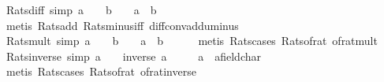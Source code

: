 \begin{isabellebody}
%
\isadelimproof
\isanewline
%
\endisadelimproof
\isanewline
{}\isamarkupfalse%
\ Rats{\isacharunderscore}{\kern0pt}diff\ {\isacharbrackleft}{\kern0pt}simp{\isacharbrackright}{\kern0pt}{\isacharcolon}{\kern0pt}\ {\isachardoublequoteopen}a\ {\isasymin}\ {\isasymrat}\ {\isasymLongrightarrow}\ b\ {\isasymin}\ {\isasymrat}\ {\isasymLongrightarrow}\ a\ {\isacharminus}{\kern0pt}\ b\ {\isasymin}\ {\isasymrat}{\isachardoublequoteclose}\isanewline
%
\isadelimproof
\ \ %
\endisadelimproof
%
\isatagproof
{}\isamarkupfalse%
\ {\isacharparenleft}{\kern0pt}metis\ Rats{\isacharunderscore}{\kern0pt}add\ Rats{\isacharunderscore}{\kern0pt}minus{\isacharunderscore}{\kern0pt}iff\ diff{\isacharunderscore}{\kern0pt}conv{\isacharunderscore}{\kern0pt}add{\isacharunderscore}{\kern0pt}uminus{\isacharparenright}{\kern0pt}%
\endisatagproof
{\isafoldproof}%
%
\isadelimproof
\isanewline
%
\endisadelimproof
\isanewline
{}\isamarkupfalse%
\ Rats{\isacharunderscore}{\kern0pt}mult\ {\isacharbrackleft}{\kern0pt}simp{\isacharbrackright}{\kern0pt}{\isacharcolon}{\kern0pt}\ {\isachardoublequoteopen}a\ {\isasymin}\ {\isasymrat}\ {\isasymLongrightarrow}\ b\ {\isasymin}\ {\isasymrat}\ {\isasymLongrightarrow}\ a\ {\isacharasterisk}{\kern0pt}\ b\ {\isasymin}\ {\isasymrat}{\isachardoublequoteclose}\isanewline
%
\isadelimproof
\ \ %
\endisadelimproof
%
\isatagproof
{}\isamarkupfalse%
\ {\isacharparenleft}{\kern0pt}metis\ Rats{\isacharunderscore}{\kern0pt}cases\ Rats{\isacharunderscore}{\kern0pt}of{\isacharunderscore}{\kern0pt}rat\ of{\isacharunderscore}{\kern0pt}rat{\isacharunderscore}{\kern0pt}mult{\isacharparenright}{\kern0pt}%
\endisatagproof
{\isafoldproof}%
%
\isadelimproof
\isanewline
%
\endisadelimproof
\isanewline
{}\isamarkupfalse%
\ Rats{\isacharunderscore}{\kern0pt}inverse\ {\isacharbrackleft}{\kern0pt}simp{\isacharbrackright}{\kern0pt}{\isacharcolon}{\kern0pt}\ {\isachardoublequoteopen}a\ {\isasymin}\ {\isasymrat}\ {\isasymLongrightarrow}\ inverse\ a\ {\isasymin}\ {\isasymrat}{\isachardoublequoteclose}\isanewline
\ \ \ a\ {\isacharcolon}{\kern0pt}{\isacharcolon}{\kern0pt}\ {\isachardoublequoteopen}{\isacharprime}{\kern0pt}a{\isacharcolon}{\kern0pt}{\isacharcolon}{\kern0pt}field{\isacharunderscore}{\kern0pt}char{\isacharunderscore}{\kern0pt}{}{\isachardoublequoteclose}\isanewline
%
\isadelimproof
\ \ %
\endisadelimproof
%
\isatagproof
{}\isamarkupfalse%
\ {\isacharparenleft}{\kern0pt}metis\ Rats{\isacharunderscore}{\kern0pt}cases\ Rats{\isacharunderscore}{\kern0pt}of{\isacharunderscore}{\kern0pt}rat\ of{\isacharunderscore}{\kern0pt}rat{\isacharunderscore}{\kern0pt}inverse{\isacharparenright}{\kern0pt}%

\end{isabellebody}
